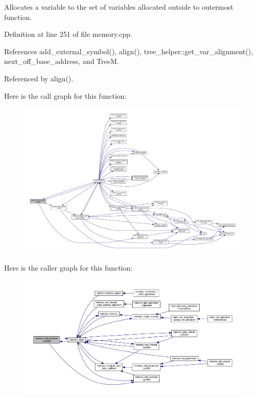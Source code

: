 Allocates a variable to the set of variables allocated outside to outermost function. 



Definition at line 251 of file memory.\+cpp.



References add\+\_\+external\+\_\+symbol(), align(), tree\+\_\+helper\+::get\+\_\+var\+\_\+alignment(), next\+\_\+off\+\_\+base\+\_\+address, and TreeM.



Referenced by align().

Here is the call graph for this function\+:
\nopagebreak
\begin{figure}[H]
\begin{center}
\leavevmode
\includegraphics[width=350pt]{d8/d99/classmemory_a794e01c8ff2ed36104240903aaa4acd4_cgraph}
\end{center}
\end{figure}
Here is the caller graph for this function\+:
\nopagebreak
\begin{figure}[H]
\begin{center}
\leavevmode
\includegraphics[width=350pt]{d8/d99/classmemory_a794e01c8ff2ed36104240903aaa4acd4_icgraph}
\end{center}
\end{figure}
\mbox{\label{classmemory_ae4d01a6e84a8701b3b04432f3c173212}} 
